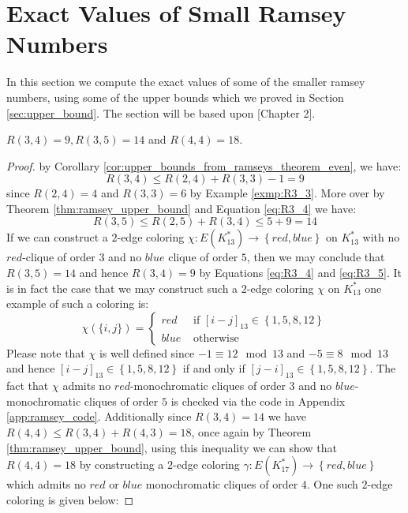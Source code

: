 \section{Exact Values of Small Ramsey Numbers}\label{sec:exact_values}
In this section we compute the exact values of some of the smaller ramsey numbers, using some of the upper bounds which we proved in Section \ref{sec:upper_bound}. The section will be based upon \cite{emogrt}[Chapter 2].
\begin{theorem}\label{thm:small_ramsey_numbers}
	$R(3, 4) = 9, R(3, 5) = 14$ and $R(4, 4) = 18$.
\end{theorem}
\begin{proof}
	by Corollary \ref{cor:upper_bounds_from_ramseys_theorem_even}, we have:
	\begin{equation}\label{eq:R3_4}
		R(3, 4) \leq R(2, 4) + R(3, 3) - 1 = 9
	\end{equation}
	since $R(2, 4) = 4$ and $R(3, 3) = 6$ by Example \ref{exmp:R3_3}. More over by Theorem \ref{thm:ramsey_upper_bound} and Equation \eqref{eq:R3_4} we have:
	\begin{equation}\label{eq:R3_5}
		R(3, 5) \leq R(2, 5) + R(3, 4) \leq 5 + 9 = 14
	\end{equation}
	If we can construct a $2$-edge coloring $\chi: E(K^{*}_{13}) \to \left\{red, blue\right\}$ on $K^{*}_{13}$ with no $red$-clique of order $3$ and no $blue$ clique of order $5$, then we may conclude that $R(3, 5) = 14$ and hence $R(3, 4) = 9$ by Equations \eqref{eq:R3_4} and \eqref{eq:R3_5}. It is in fact the case that we may construct such a $2$-edge coloring $\chi$ on $K^{*}_{13}$ one example of such a coloring is:
	\begin{equation*}
		\chi(\{i, j\}) = \begin{cases}
			red  & \text{ if } [i - j]_{13} \in \left\{1, 5, 8, 12\right\} \\
			blue & \text{ otherwise }
		\end{cases}
	\end{equation*}
	Please note that $\chi$ is well defined since $-1 \equiv 12 \mod 13$ and $-5 \equiv 8 \mod 13$ and hence $[i - j]_{13} \in \left\{1, 5, 8, 12\right\}$ if and only if $[j - i]_{13} \in \left\{1, 5, 8, 12\right\}$. The fact that $\chi$ admits no $red$-monochromatic cliques of order $3$ and no $blue$-monochromatic cliques of order $5$ is checked via the code in Appendix \ref{app:ramsey_code}.
	Additionally since $R(3, 4) = 14$ we have $R(4, 4) \leq R(3, 4) + R(4, 3) = 18$, once again by Theorem \ref{thm:ramsey_upper_bound}, using this inequality we can show that $R(4, 4) = 18$ by constructing a $2$-edge coloring $\gamma: E(K^{*}_{17}) \to \left\{red, blue\right\}$ which admits no $red$ or $blue$ monochromatic cliques of order $4$. One such $2$-edge coloring is given below:

\end{proof}

